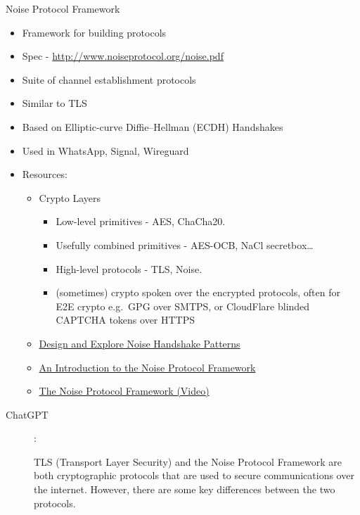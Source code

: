 \label{notes__02022-noise.md}
\begin{block}{Noise Protocol Framework}
\label{notes__02022-noise.md__noise-protocol-framework}
\begin{itemize}
\tightlist
\item
  Framework for building protocols
\item
  Spec - \url{http://www.noiseprotocol.org/noise.pdf}
\item
  Suite of channel establishment protocols
\item
  Similar to TLS
\item
  Based on Elliptic-curve Diffie--Hellman (ECDH) Handshakes
\item
  Used in WhatsApp, Signal, Wireguard
\item
  Resources:

  \begin{itemize}
  \tightlist
  \item
    Crypto Layers

    \begin{itemize}
    \tightlist
    \item
      Low-level primitives - AES, ChaCha20.
    \item
      Usefully combined primitives - AES-OCB, NaCl secretbox\ldots{}
    \item
      High-level protocols - TLS, Noise.
    \item
      (sometimes) crypto spoken over the encrypted protocols, often for E2E crypto e.g.~GPG over SMTPS, or CloudFlare blinded CAPTCHA tokens over HTTPS
    \end{itemize}
  \item
    \href{https://noiseexplorer.com/}{Design and Explore Noise Handshake Patterns}
  \item
    \href{https://duo.com/labs/tech-notes/noise-protocol-framework-intro}{An Introduction to the Noise Protocol Framework}
  \item
    \href{https://www.youtube.com/watch?v=ceGTgqypwnQ}{The Noise Protocol Framework (Video)}
  \end{itemize}
\end{itemize}

\begin{description}
\item[ChatGPT]
:

TLS (Transport Layer Security) and the Noise Protocol Framework are both cryptographic protocols that are used to secure communications over the internet. However, there are some key differences between the two protocols.


\end{description}
\end{block}
